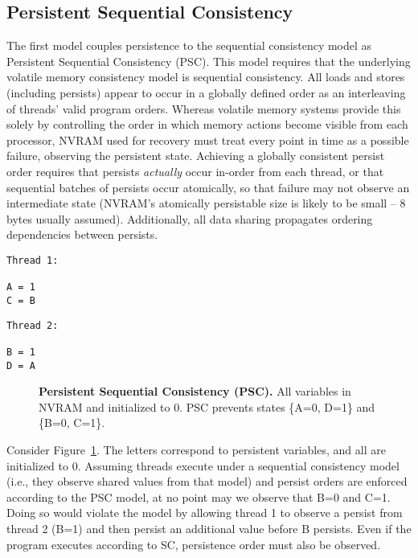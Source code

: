 \subsection{Persistent Sequential Consistency}
\label{sec:PMC:PersistenceModels:PSC}

The first model couples persistence to the sequential consistency model as Persistent Sequential Consistency (PSC).
This model requires that the underlying volatile memory consistency model is sequential consistency.
All loads and stores (including persists) appear to occur in a globally defined order as an interleaving of threads' valid program orders.
Whereas volatile memory systems provide this solely by controlling the order in which memory actions become visible from each processor, NVRAM used for recovery must treat every point in time as a possible failure, observing the persistent state.
Achieving a globally consistent persist order requires that persists \emph{actually} occur in-order from each thread, or that sequential batches of persists occur atomically, so that failure may not observe an intermediate state (NVRAM's atomically persistable size is likely to be small -- 8 bytes usually assumed).
Additionally, all data sharing propagates ordering dependencies between persists.

{
\singlespacing
\newsavebox{\PSCThreadOne}
\begin{lrbox}{\PSCThreadOne}
  \begin{lstlisting}
Thread 1:

A = 1
C = B
  \end{lstlisting}
\end{lrbox}

\newsavebox{\PSCThreadTwo}
\begin{lrbox}{\PSCThreadTwo}
  \begin{lstlisting}
Thread 2:

B = 1
D = A
  \end{lstlisting}
\end{lrbox}

\begin{figure}[]
\centering
\subfigure{ \usebox{\PSCThreadOne} }
\hspace{1 in}
\subfigure{ \usebox{\PSCThreadTwo} }
\caption{\textbf{Persistent Sequential Consistency (PSC).} All variables in NVRAM and initialized to 0.  PSC prevents states \{A=0, D=1\} and \{B=0, C=1\}.}
\label{fig:PSC}
\end{figure}
}

Consider Figure~\ref{fig:PSC}.
The letters correspond to persistent variables, and all are initialized to 0.
Assuming threads execute under a sequential consistency model (i.e., they observe shared values from that model) and persist orders are enforced according to the PSC model, at no point may we observe that B=0 and C=1.
Doing so would violate the model by allowing thread 1 to observe a persist from thread 2 (B=1) and then persist an additional value before B persists.
Even if the program executes according to SC, persistence order must also be observed.

